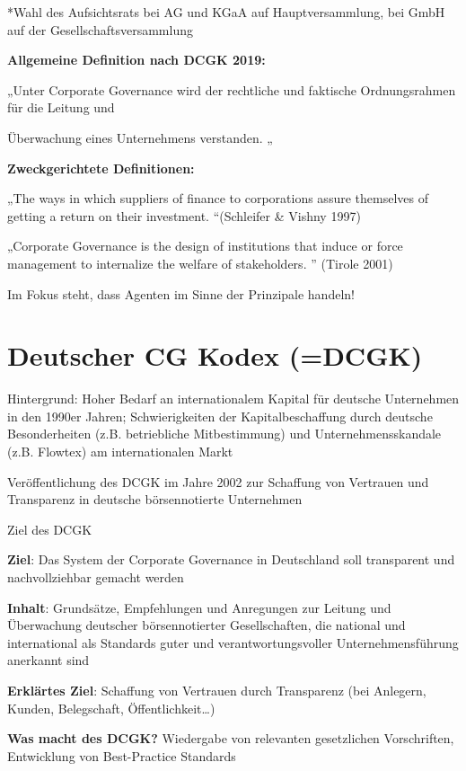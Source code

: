 \documentclass[
]{article}
\begin{document}
*Wahl des Aufsichtsrats bei AG und KGaA auf Hauptversammlung, bei GmbH
auf der Gesellschaftsversammlung

\textbf{Allgemeine Definition nach DCGK 2019:}

„Unter Corporate Governance wird der rechtliche und faktische
Ordnungsrahmen für die Leitung und

Überwachung eines Unternehmens verstanden. „

\textbf{Zweckgerichtete Definitionen:}

„The ways in which suppliers of finance to corporations assure
themselves of getting a return on their investment. ``(Schleifer \&
Vishny 1997)

„Corporate Governance is the design of institutions that induce or force
management to internalize the welfare of stakeholders. '' (Tirole 2001)

Im Fokus steht, dass Agenten im Sinne der Prinzipale handeln!

\hypertarget{deutscher-cg-kodex-dcgk}{%
\section{Deutscher CG Kodex (=DCGK)}\label{deutscher-cg-kodex-dcgk}}

Hintergrund: Hoher Bedarf an internationalem Kapital für deutsche
Unternehmen in den 1990er Jahren; Schwierigkeiten der Kapitalbeschaffung
durch deutsche Besonderheiten (z.B. betriebliche Mitbestimmung) und
Unternehmensskandale (z.B. Flowtex) am internationalen Markt

Veröffentlichung des DCGK im Jahre 2002 zur Schaffung von Vertrauen und
Transparenz in deutsche börsennotierte Unternehmen

Ziel des DCGK

\textbf{Ziel}: Das System der Corporate Governance in Deutschland soll
transparent und nachvollziehbar gemacht werden

\textbf{Inhalt}: Grundsätze, Empfehlungen und Anregungen zur Leitung und
Überwachung deutscher börsennotierter Gesellschaften, die national und
international als Standards guter und verantwortungsvoller
Unternehmensführung anerkannt sind

\textbf{Erklärtes Ziel}: Schaffung von Vertrauen durch Transparenz (bei
Anlegern, Kunden, Belegschaft, Öffentlichkeit\ldots)

\textbf{Was macht des DCGK?} Wiedergabe von relevanten gesetzlichen
Vorschriften, Entwicklung von Best-Practice Standards
\end{document}
